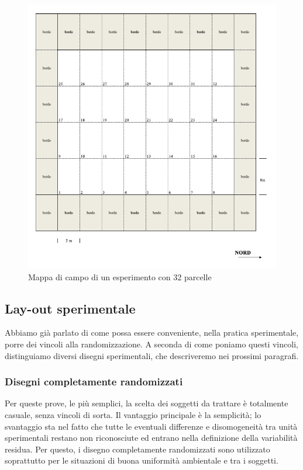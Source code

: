 \documentclass[a4paper,12pt,oneside]{book}
\begin{document}
\begin{figure}

{\centering \includegraphics[width=0.9\linewidth]{_images/Mappa1} 

}

\caption{Mappa di campo di un esperimento con 32 parcelle}\label{fig:figName31}
\end{figure}

\hypertarget{lay-out-sperimentale}{%
\subsection{Lay-out sperimentale}\label{lay-out-sperimentale}}

Abbiamo già parlato di come possa essere conveniente, nella pratica sperimentale, porre dei vincoli alla randomizzazione. A seconda di come poniamo questi vincoli, distinguiamo diversi disegni sperimentali, che descriveremo nei prossimi paragrafi.

\hypertarget{disegni-completamente-randomizzati}{%
\subsubsection{Disegni completamente randomizzati}\label{disegni-completamente-randomizzati}}

Per queste prove, le più semplici, la scelta dei soggetti da trattare è totalmente casuale, senza vincoli di sorta. Il vantaggio principale è la semplicità; lo svantaggio sta nel fatto che tutte le eventuali differenze e disomogeneità tra unità sperimentali restano non riconosciute ed entrano nella definizione della variabilità residua. Per questo, i disegno completamente randomizzati sono utilizzato soprattutto per le situazioni di buona uniformità ambientale e tra i soggetti.
\end{document}
